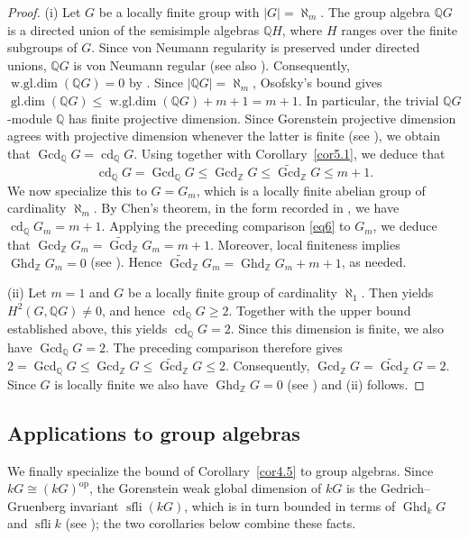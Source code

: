 \documentclass[12pt]{amsart}
\theoremstyle{remark}
\theoremstyle{definition}
\theoremstyle{plain}
\DeclareMathOperator{\Ghd}{Ghd}
\DeclareMathOperator{\Gcd}{Gcd}
\DeclareMathOperator{\cd}{cd}
\DeclareMathOperator{\sfli}{sfli}
\DeclareMathOperator{\wgl}{w.gl.dim}
\DeclareMathOperator{\gldim}{gl.dim}
\newcommand{\PGFcd}{\widetilde{\Gcd}}
\begin{document}
\begin{proof}
(i) Let $G$ be a locally finite group with
$|G|=\aleph_m$. The group algebra $\mathbb{Q}G$ is a
directed union of the semisimple algebras $\mathbb{Q}H$,
where $H$ ranges over the finite subgroups of $G$.
Since von Neumann regularity is preserved under directed unions, $\mathbb{Q}G$ is
von Neumann regular (see also
\cite[Theorem~3 and the subsequent Remark~(b), p.~659]{Connell1963}).
Consequently,
$\wgl(\mathbb{Q}G)=0$
by \cite[Theorem~4.2.9]{Weibel1994}.
Since $|\mathbb{Q}G|=\aleph_m$, Osofsky's bound
\cite[Corollary~1.4]{Osofsky1968} gives $\gldim(\mathbb{Q}G)\leq \wgl(\mathbb{Q}G)+m+1
=m+1.$
In particular, the trivial $\mathbb{Q}G$-module $\mathbb{Q}$
has finite projective dimension. Since Gorenstein projective
dimension agrees with projective dimension whenever the latter
is finite (see \cite[Proposition~2.27]{Hol}), we obtain that $\Gcd_{\mathbb{Q}}G=\cd_{\mathbb{Q}}G.$
Using \cite[Corollary~4.2]{Ren} together with Corollary~\ref{cor5.1}, we deduce that
\begin{equation}\label{eq6}
	\cd_{\mathbb{Q}}G
=\Gcd_{\mathbb{Q}}G
\leq\Gcd_{\mathbb{Z}}G
\leq\PGFcd_{\mathbb{Z}}G
\leq m+1.
\end{equation}
We now specialize this to $G=G_m$, which is a locally finite abelian group of cardinality $\aleph_m$. By Chen's theorem, in the form recorded in
\cite[Corollary~6.10(2)]{DKLT2002}, we have
$\cd_{\mathbb{Q}}G_m=m+1.$
Applying the preceding comparison \eqref{eq6} to $G_m$, we deduce that
$\Gcd_{\mathbb{Z}}G_m
=\PGFcd_{\mathbb{Z}}G_m
=m+1$.
Moreover, local finiteness implies
$\Ghd_{\mathbb{Z}}G_m=0$ (see \cite[Theorem~1.4]{KS}). Hence
$\PGFcd_{\mathbb{Z}}G_m
=\Ghd_{\mathbb{Z}}G_m+m+1$, as needed.

(ii) Let $m=1$ and $G$ be a locally finite group of cardinality $\aleph_1$. Then
\cite[Theorem~5.4]{DKLT2002} yields $H^2(G,\mathbb{Q}G)\neq 0$,
and hence $\cd_{\mathbb{Q}}G\geq 2$.
Together with the upper bound established above, this yields
$\cd_{\mathbb{Q}}G=2$.
Since this dimension is finite, we also have
$\Gcd_{\mathbb{Q}}G=2$.
The preceding comparison therefore gives
$2=\Gcd_{\mathbb{Q}}G
\leq\Gcd_{\mathbb{Z}}G
\leq\PGFcd_{\mathbb{Z}}G
\leq 2.$
Consequently,
$\Gcd_{\mathbb{Z}}G
=\PGFcd_{\mathbb{Z}}G
=2.$
Since $G$ is locally finite we also have $\Ghd_{\mathbb Z}G=0$ (see \cite[Theorem~1.4]{KS}) and (ii) follows.
\end{proof}


\subsection{Applications to group algebras} We finally specialize the bound of Corollary~\ref{cor4.5} to group algebras. Since $kG\cong(kG)^{\mathrm{op}}$, the Gorenstein weak global dimension of $kG$ is the Gedrich--Gruenberg invariant $\sfli(kG)$, which is in turn bounded in terms of $\Ghd_kG$ and $\sfli k$ (see \cite[Corollary~6.2]{KS}); the two corollaries below combine these facts.
\end{document}
